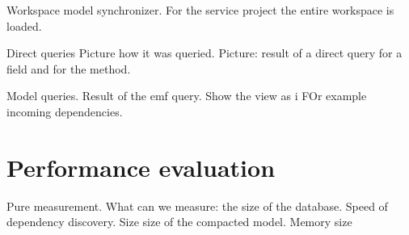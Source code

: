 Workspace model synchronizer.
For the service project the entire workspace is loaded. 

Direct queries
Picture how it was queried.
Picture: result of a direct query for a field and for the method.


Model queries.
Result of the emf query.
Show the view as i
FOr example incoming dependencies.


\section{Performance evaluation}
Pure measurement. What can we measure:
the size of the database.
Speed of dependency discovery.
Size size of the compacted model. 
Memory size